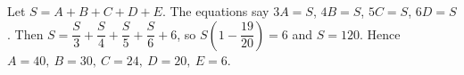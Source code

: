 Let $S=A+B+C+D+E$. The equations say $3A=S$, $4B=S$, $5C=S$, $6D=S$. Then $S=\dfrac S3+\dfrac S4+\dfrac S5+\dfrac S6+6$, so $S\left(1-\dfrac{19}{20}\right)=6$ and $S=120$. Hence $\boxed{A=40,\ B=30,\ C=24,\ D=20,\ E=6}$.

